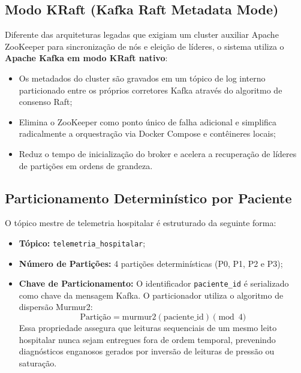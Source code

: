 \documentclass[12pt,a4paper]{article}
\begin{document}
\subsection{Modo KRaft (Kafka Raft Metadata Mode)}
Diferente das arquiteturas legadas que exigiam um cluster auxiliar Apache ZooKeeper para sincronização de nós e eleição de líderes, o sistema utiliza o \textbf{Apache Kafka em modo KRaft nativo}:
\begin{itemize}
	\item Os metadados do cluster são gravados em um tópico de log interno particionado entre os próprios corretores Kafka através do algoritmo de consenso Raft;
	\item Elimina o ZooKeeper como ponto único de falha adicional e simplifica radicalmente a orquestração via Docker Compose e contêineres locais;
	\item Reduz o tempo de inicialização do broker e acelera a recuperação de líderes de partições em ordens de grandeza.
\end{itemize}

\subsection{Particionamento Determinístico por Paciente}
O tópico mestre de telemetria hospitalar é estruturado da seguinte forma:
\begin{itemize}
	\item \textbf{Tópico:} \texttt{telemetria\_hospitalar};
	\item \textbf{Número de Partições:} 4 partições determinísticas (P0, P1, P2 e P3);
	\item \textbf{Chave de Particionamento:} O identificador \texttt{paciente\_id} é serializado como chave da mensagem Kafka. O particionador utiliza o algoritmo de dispersão Murmur2:
	\begin{equation}
		\text{Partição} = \text{murmur2}(\text{paciente\_id}) \pmod 4
	\end{equation}
	Essa propriedade assegura que leituras sequenciais de um mesmo leito hospitalar nunca sejam entregues fora de ordem temporal, prevenindo diagnósticos enganosos gerados por inversão de leituras de pressão ou saturação.
\end{itemize}
\end{document}
